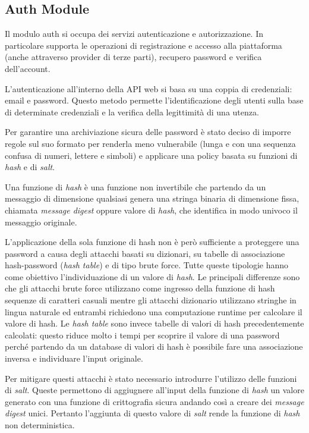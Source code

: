 \subsection{Auth Module}
Il modulo auth si occupa dei servizi autenticazione e autorizzazione.
In particolare supporta le operazioni di registrazione e accesso alla piattaforma (anche attraverso provider di terze parti), recupero password e verifica dell'account.

L'autenticazione all'interno della API web si basa su una coppia di credenziali: email e password.
Questo metodo permette l'identificazione degli utenti sulla base di determinate credenziali e la
verifica della legittimità di una utenza.

Per garantire una archiviazione sicura delle password è stato deciso di imporre regole sul suo formato per renderla meno vulnerabile (lunga e con una sequenza confusa di numeri, lettere e simboli)
e applicare una policy basata su funzioni di \textit{hash} e di \textit{salt}.

Una funzione di \textit{hash} è una funzione non invertibile che partendo da un messaggio di dimensione qualsiasi genera una stringa
binaria di dimensione fissa, chiamata \textit{message digest} oppure valore di \textit{hash}, che identifica in modo univoco il messaggio originale.

L'applicazione della sola funzione di hash non è però sufficiente a proteggere una password a causa degli attacchi basati su dizionari, su tabelle di associazione
hash-password (\textit{hash table}) e di tipo brute force. Tutte queste tipologie hanno come obiettivo l'individuazione di un valore di \textit{hash}.
Le principali differenze sono che gli attacchi brute force utilizzano come ingresso della funzione di hash sequenze di caratteri casuali mentre gli attacchi dizionario utilizzano
stringhe in lingua naturale ed entrambi richiedono una computazione runtime per calcolare il valore di hash.
Le \textit{hash table} sono invece tabelle di valori di hash precedentemente calcolati: questo riduce molto i tempi per scoprire il valore di una password
perché partendo da un database di valori di hash è possibile fare una associazione inversa e individuare l'input originale.

Per mitigare questi attacchi è stato necessario introdurre l'utilizzo delle funzioni di \textit{salt}.
Queste permettono di aggiugnere all'input della funzione di \textit{hash} un valore generato con una funzione di crittografia sicura andando così a creare dei \textit{message digest} unici.
Pertanto l'aggiunta di questo valore di \textit{salt} rende la funzione di \textit{hash} non deterministica.

